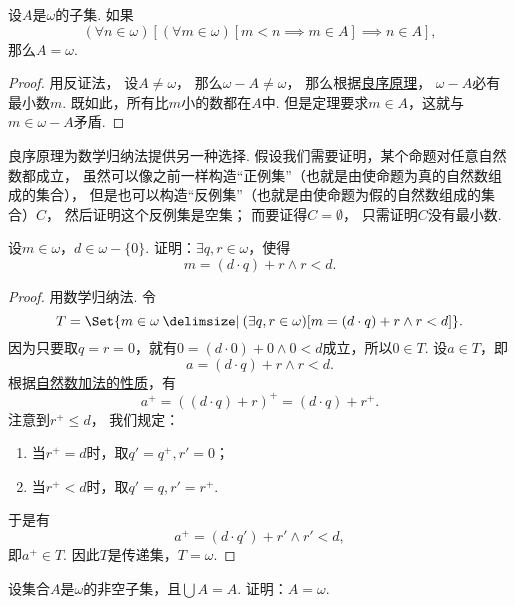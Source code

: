 \begin{theorem}[强归纳原理]\label{theorem:集合论.归纳原理2}
设\(A\)是\(\omega\)的子集.
如果\[
	(\forall n \in \omega)[
		(\forall m \in \omega)[m < n \implies m \in A]
		\implies
		n \in A
	],
\]
那么\(A = \omega\).
\begin{proof}
用反证法，
设\(A \neq \omega\)，
那么\(\omega - A \neq \omega\)，
那么根据\hyperref[theorem:集合论.自然数集的良序]{良序原理}，
\(\omega - A\)必有最小数\(m\).
既如此，所有比\(m\)小的数都在\(A\)中.
但是定理要求\(m \in A\)，这就与\(m \in \omega - A\)矛盾.
\end{proof}
\end{theorem}

良序原理为数学归纳法提供另一种选择.
假设我们需要证明，某个命题对任意自然数都成立，
虽然可以像之前一样构造“正例集”（也就是由使命题为真的自然数组成的集合），
但是也可以构造“反例集”（也就是由使命题为假的自然数组成的集合）\(C\)，
然后证明这个反例集是空集；
而要证得\(C = \emptyset\)，
只需证明\(C\)没有最小数.

\begin{example}
设\(m\in\omega\)，\(d\in\omega-\{0\}\).
证明：\(\exists q,r\in\omega\)，使得\[
	m=(d \cdot q)+r
	\land
	r<d.
\]
\begin{proof}
用数学归纳法.
令\[
	T = \Set{
		m \in \omega
		\given
		(\exists q,r\in\omega)[
			m=(d \cdot q)+r
			\land
			r<d
		]
	}.
\]
因为只要取\(q=r=0\)，就有\(0=(d\cdot0)+0\land0<d\)成立，所以\(0 \in T\).
设\(a \in T\)，即\[
	a = (d \cdot q) + r \land r < d.
\]
根据\hyperref[equation:集合论.自然数的加法.性质2]{自然数加法的性质}，有\[
	a^+ = ((d \cdot q) + r)^+
	= (d \cdot q) + r^+.
\]
注意到\(r^+ \leqslant d\)，
我们规定：\begin{enumerate}
	\item 当\(r^+=d\)时，取\(q'=q^+, r'=0\)；
	\item 当\(r^+<d\)时，取\(q'=q, r'=r^+\).
\end{enumerate}
于是有\[
	a^+ = (d \cdot q') + r'
	\land
	r' < d,
\]
即\(a^+ \in T\).
因此\(T\)是传递集，\(T = \omega\).
\end{proof}
\end{example}

\begin{example}
设集合\(A\)是\(\omega\)的非空子集，且\(\bigcup A = A\).
证明：\(A=\omega\).
\end{example}


